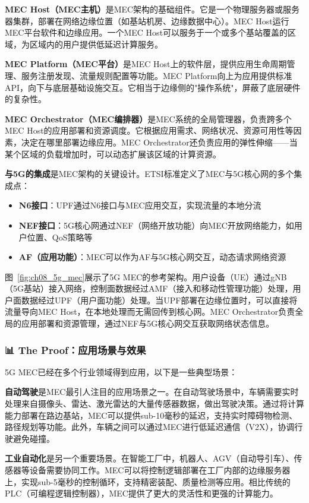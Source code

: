 \textbf{MEC Host（MEC主机）}是MEC架构的基础组件。它是一个物理服务器或服务器集群，部署在网络边缘位置（如基站机房、边缘数据中心）。MEC Host运行MEC平台软件和边缘应用。一个MEC Host可以服务于一个或多个基站覆盖的区域，为区域内的用户提供低延迟计算服务。

\textbf{MEC Platform（MEC平台）}是MEC Host上的软件层，提供应用生命周期管理、服务注册发现、流量规则配置等功能。MEC Platform向上为应用提供标准API，向下与底层基础设施交互。它相当于边缘侧的"操作系统"，屏蔽了底层硬件的复杂性。

\textbf{MEC Orchestrator（MEC编排器）}是MEC系统的全局管理器，负责跨多个MEC Host的应用部署和资源调度。它根据应用需求、网络状况、资源可用性等因素，决定在哪里部署边缘应用。MEC Orchestrator还负责应用的弹性伸缩——当某个区域的负载增加时，可以动态扩展该区域的计算资源。

\textbf{与5G的集成}是MEC架构的关键设计。ETSI标准定义了MEC与5G核心网的多个集成点：

\begin{itemize}
    \item \textbf{N6接口}：UPF通过N6接口与MEC应用交互，实现流量的本地分流
    \item \textbf{NEF接口}：5G核心网通过NEF（网络开放功能）向MEC开放网络能力，如用户位置、QoS策略等
    \item \textbf{AF（应用功能）}：MEC可以作为AF与5G核心网交互，动态请求网络资源
\end{itemize}

图~\ref{fig:ch08_5g_mec}展示了5G MEC的参考架构。用户设备（UE）通过gNB（5G基站）接入网络，控制面数据经过AMF（接入和移动性管理功能）处理，用户面数据经过UPF（用户面功能）处理。当UPF部署在边缘位置时，可以直接将流量导向MEC Host，在本地处理而无需回传到核心网。MEC Orchestrator负责全局的应用部署和资源管理，通过NEF与5G核心网交互获取网络状态信息。

\subsubsection{📊 The Proof：应用场景与效果}

5G MEC已经在多个行业领域得到应用，以下是一些典型场景：

\textbf{自动驾驶}是MEC最引人注目的应用场景之一。在自动驾驶场景中，车辆需要实时处理来自摄像头、雷达、激光雷达的大量传感器数据，做出驾驶决策。通过将计算能力部署在路边基站，MEC可以提供sub-10毫秒的延迟，支持实时障碍物检测、路径规划等功能。此外，车辆之间可以通过MEC进行低延迟通信（V2X），协调行驶避免碰撞。

\textbf{工业自动化}是另一个重要场景。在智能工厂中，机器人、AGV（自动导引车）、传感器等设备需要协同工作。MEC可以将控制逻辑部署在工厂内部的边缘服务器上，实现sub-5毫秒的控制循环，支持精密装配、质量检测等应用。相比传统的PLC（可编程逻辑控制器），MEC提供了更大的灵活性和更强的计算能力。

